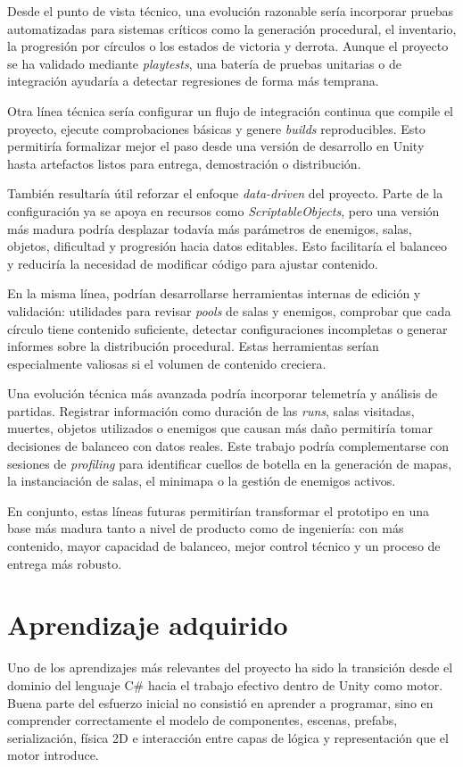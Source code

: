 Desde el punto de vista técnico, una evolución razonable sería incorporar pruebas
automatizadas para sistemas críticos como la generación procedural, el inventario, la
progresión por círculos o los estados de victoria y derrota. Aunque el proyecto se ha
validado mediante \textit{playtests}, una batería de pruebas unitarias o de integración
ayudaría a detectar regresiones de forma más temprana.

Otra línea técnica sería configurar un flujo de integración continua que compile el
proyecto, ejecute comprobaciones básicas y genere \textit{builds} reproducibles. Esto
permitiría formalizar mejor el paso desde una versión de desarrollo en Unity hasta
artefactos listos para entrega, demostración o distribución.

También resultaría útil reforzar el enfoque \textit{data-driven} del proyecto. Parte de la
configuración ya se apoya en recursos como \textit{ScriptableObjects}, pero una versión más
madura podría desplazar todavía más parámetros de enemigos, salas, objetos, dificultad y
progresión hacia datos editables. Esto facilitaría el balanceo y reduciría la necesidad de
modificar código para ajustar contenido.

En la misma línea, podrían desarrollarse herramientas internas de edición y validación:
utilidades para revisar \textit{pools} de salas y enemigos, comprobar que cada círculo tiene
contenido suficiente, detectar configuraciones incompletas o generar informes sobre la
distribución procedural. Estas herramientas serían especialmente valiosas si el volumen de
contenido creciera.

Una evolución técnica más avanzada podría incorporar telemetría y análisis de partidas.
Registrar información como duración de las \textit{runs}, salas visitadas, muertes, objetos
utilizados o enemigos que causan más daño permitiría tomar decisiones de balanceo con datos
reales. Este trabajo podría complementarse con sesiones de \textit{profiling} para
identificar cuellos de botella en la generación de mapas, la instanciación de salas, el
minimapa o la gestión de enemigos activos.

En conjunto, estas líneas futuras permitirían transformar el prototipo en una base más
madura tanto a nivel de producto como de ingeniería: con más contenido, mayor capacidad de
balanceo, mejor control técnico y un proceso de entrega más robusto.

\section{Aprendizaje adquirido}
Uno de los aprendizajes más relevantes del proyecto ha sido la transición desde el dominio
del lenguaje C\# hacia el trabajo efectivo dentro de Unity como motor. Buena parte del
esfuerzo inicial no consistió en aprender a programar, sino en comprender correctamente el
modelo de componentes, escenas, prefabs, serialización, física 2D e interacción entre capas
de lógica y representación que el motor introduce.

